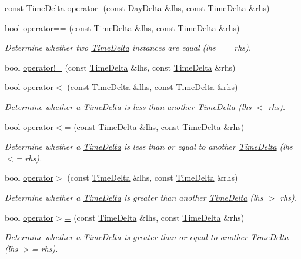 \begin{DoxyCompactItemize}
\item 
const \hyperlink{structTimeDelta}{Time\-Delta} \hyperlink{structTimeDelta_afa45b09b5e63a55e656879efe36665d8}{operator-\/} (const \hyperlink{structDayDelta}{Day\-Delta} \&lhs, const \hyperlink{structTimeDelta}{Time\-Delta} \&rhs)
\item 
bool \hyperlink{structTimeDelta_a9a4d0c810cfb1ede0c5abd2058ffa880}{operator==} (const \hyperlink{structTimeDelta}{Time\-Delta} \&lhs, const \hyperlink{structTimeDelta}{Time\-Delta} \&rhs)
\begin{DoxyCompactList}\small\item\em Determine whether two \hyperlink{structTimeDelta}{Time\-Delta} instances are equal (lhs == rhs). \end{DoxyCompactList}\item 
bool \hyperlink{structTimeDelta_a34ecf194f14217e5a53721b47b55afea}{operator!=} (const \hyperlink{structTimeDelta}{Time\-Delta} \&lhs, const \hyperlink{structTimeDelta}{Time\-Delta} \&rhs)
\item 
bool \hyperlink{structTimeDelta_a46cbd1394d5b9a671a2663d1ec292133}{operator$<$} (const \hyperlink{structTimeDelta}{Time\-Delta} \&lhs, const \hyperlink{structTimeDelta}{Time\-Delta} \&rhs)
\begin{DoxyCompactList}\small\item\em Determine whether a \hyperlink{structTimeDelta}{Time\-Delta} is less than another \hyperlink{structTimeDelta}{Time\-Delta} (lhs $<$ rhs). \end{DoxyCompactList}\item 
bool \hyperlink{structTimeDelta_af313f41f00c31292ebf02d238270f925}{operator$<$=} (const \hyperlink{structTimeDelta}{Time\-Delta} \&lhs, const \hyperlink{structTimeDelta}{Time\-Delta} \&rhs)
\begin{DoxyCompactList}\small\item\em Determine whether a \hyperlink{structTimeDelta}{Time\-Delta} is less than or equal to another \hyperlink{structTimeDelta}{Time\-Delta} (lhs $<$= rhs). \end{DoxyCompactList}\item 
bool \hyperlink{structTimeDelta_a321108cfb9e3902874cc743d899c4076}{operator$>$} (const \hyperlink{structTimeDelta}{Time\-Delta} \&lhs, const \hyperlink{structTimeDelta}{Time\-Delta} \&rhs)
\begin{DoxyCompactList}\small\item\em Determine whether a \hyperlink{structTimeDelta}{Time\-Delta} is greater than another \hyperlink{structTimeDelta}{Time\-Delta} (lhs $>$ rhs). \end{DoxyCompactList}\item 
bool \hyperlink{structTimeDelta_a044ffed3fee34cab3b4abaf4869c5c0c}{operator$>$=} (const \hyperlink{structTimeDelta}{Time\-Delta} \&lhs, const \hyperlink{structTimeDelta}{Time\-Delta} \&rhs)
\begin{DoxyCompactList}\small\item\em Determine whether a \hyperlink{structTimeDelta}{Time\-Delta} is greater than or equal to another \hyperlink{structTimeDelta}{Time\-Delta} (lhs $>$= rhs). \end{DoxyCompactList}\end{DoxyCompactItemize}
